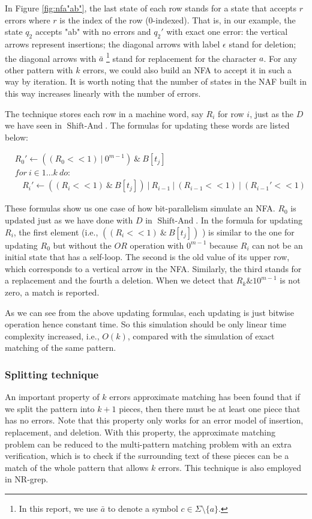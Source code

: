 In Figure \ref{fig:nfa"ab"}, the last state of each row stands for a state that accepts $r$ errors where $r$ is the index of the row (0-indexed). That is, in our example, the state $q_2$ accepts "ab" with no errors and $q_2'$  with exact one error: the vertical arrows represent insertions; the diagonal arrows with label $\epsilon$ stand for deletion; the diagonal arrows with $\bar{a}$  \footnote{In this report, we use $\bar{a}$ to denote a symbol $c \in \Sigma \setminus \{a\}$. } stand for replacement for the character $a$. For any other pattern with $k$ errors, we could also build an NFA to accept it in such a way by iteration. It is worth noting that the number of states in the NAF built in this way increases linearly with the number of errors.

The technique stores each row in a machine word, say $R_i$ for row $i$, just as the $D$ we have seen in $\operatorname{Shift-And}$.
The formulas for updating these words are listed below:

\begin{align*}
&R_0' \leftarrow  ((R_0 << 1) \ |\ 0^{m-1}) \ \& \ B[t_j] \\
&for \ i \in 1...k \ do:  \\
&\ \ \ \ R_i' \leftarrow ((R_i << 1) \ \& \ B[t_j] ) \ |\ R_{i-1} \ | \ (R_{i-1} << 1 ) \ |\ (R_{i-1}' << 1)
\end{align*}

These formulas show us one case of how bit-parallelism simulate an NFA. $R_0$ is updated just as we have done with $D$ in $\operatorname{Shift-And}$. In the formula for updating $R_i$, the first element (i.e., $((R_i << 1) \ \& \ B[t_j] ) $ ) is similar to the one for updating $R_0$  but without the $OR$ operation with $0^{m-1}$ because $R_i$ can not be an initial state that has a self-loop. The second is the old value of its upper row, which corresponds to a vertical arrow in the NFA. Similarly, the third stands for a replacement and the fourth a deletion. When we detect that $R_k \& 10^{m-1}$ is not zero, a match is reported.  

As we can see from the above updating formulas, each updating is just bitwise operation hence constant time. So this simulation should be only linear time complexity increased, i.e., $O(k)$, compared with the simulation of exact matching of the same pattern.


\subsubsection{Splitting technique}
An important property of $k$ errors approximate matching has been found that if we split the pattern into $k+1$ pieces, then there must be at least one piece that has no errors\cite{wu1992}. Note that this property only works for an error model of insertion, replacement, and deletion. With this property, the approximate matching problem can be reduced to the multi-pattern matching problem with an extra verification, which is to check if the surrounding text of these pieces can be a match of the whole pattern that allows $k$ errors. This technique is also employed in NR-grep. 
